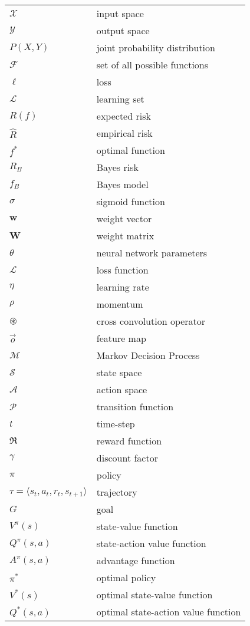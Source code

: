 \begin{tabularx}{\textwidth}{ l X }
 $\mathcal{X}$ & input space \\
 $\mathcal{Y}$ & output space \\
 $P(X,Y)$ & joint probability distribution \\ 
 $\mathcal{F}$ & set of all possible functions \\ 
 $\ell$ & loss \\
 $\mathcal{L}$ & learning set \\ 
 $R(f)$ & expected risk \\ 
 $\hat{R}$ & empirical risk \\ 
 $f^{*}$ & optimal function \\ 
 $R_B$ & Bayes risk \\ 
 $f_B$ & Bayes model \\ 
 $\sigma$ & sigmoid function \\ 
 $\mathbf{w}$ & weight vector \\ 
 $\mathbf{W}$ & weight matrix \\ 
 $\theta$ & neural network parameters \\ 
 $\mathscr{L}$ & loss function \\ 
 $\eta$ & learning rate \\  
 $\rho$ & momentum \\ 
 $\circledast$ & cross convolution operator \\ 
 $\vec{o}$ & feature map \\
$\mathcal{M}$ & Markov Decision Process \\ 
$\mathcal{S}$ & state space \\ 
$\mathcal{A}$ & action space \\
$\mathcal{P}$ & transition function \\ 
$t$ & time-step \\
$\Re$ & reward function \\ 
$\gamma$ & discount factor \\ 
$\pi$ & policy \\ 
$\tau = \langle s_t,a_t,r_t,s_{t+1}\rangle$ & trajectory \\ 
$G$ & goal \\ 
$V^{\pi}(s)$ & state-value function \\
$Q^{\pi}(s,a)$ & state-action value function \\ 
$A^{\pi}(s,a)$ & advantage function \\
$\pi^{*}$ & optimal policy \\ 
$V^{*}(s)$ & optimal state-value function \\
$Q^{*}(s,a)$ & optimal state-action value function \\
	
\end{tabularx}
\clearpage


